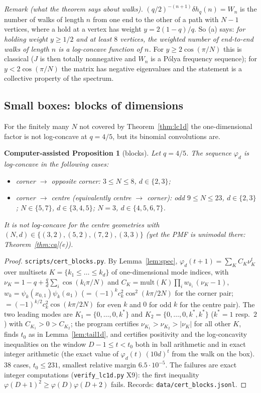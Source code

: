 \documentclass[11pt,a4paper]{article}
\newtheorem{caproposition}[theorem]{Computer-assisted Proposition}
\theoremstyle{definition}
\begin{document}
\emph{Remark (what the theorem says about walks).} $(q/2)^{-(n+1)}\delta h_q(n)=W_n$ is the number of walks of length $n$ from one end to the other of a path with $N-1$ vertices, where a hold at a vertex has weight $y=2(1-q)/q$. So (a) says: \emph{for holding weight $y\ge1/2$ and at least $8$ vertices, the weighted number of end-to-end walks of length $n$ is a log-concave function of $n$.} For $y\ge2\cos(\pi/N)$ this is classical ($J$ is then totally nonnegative and $W_n$ is a P\'olya frequency sequence); for $y<2\cos(\pi/N)$ the matrix has negative eigenvalues and the statement is a collective property of the spectrum.

\subsection{Small boxes: blocks of dimensions}\label{sec:small}

For the finitely many $N$ not covered by Theorem~\ref{thm:lc1d} the one-dimensional factor is not log-concave at $q=4/5$, but its binomial convolutions are.

\begin{caproposition}[blocks]\label{prop:smallblocks}
Let $q=4/5$. The sequence $\varphi_d$ is log-concave in the following cases:
\begin{itemize}
\item corner $\to$ opposite corner: $3\le N\le8$, $d\in\{2,3\}$;
\item corner $\to$ centre (equivalently centre $\to$ corner): odd $9\le N\le23$, $d\in\{2,3\}$; $N\in\{5,7\}$, $d\in\{3,4,5\}$; $N=3$, $d\in\{4,5,6,7\}$.
\end{itemize}
It is \emph{not} log-concave for the centre geometries with $(N,d)\in\{(3,2),(5,2),(7,2),(3,3)\}$ (yet the PMF is unimodal there: Theorem~\ref{thm:ca}(e)).
\end{caproposition}
\begin{proof}
\texttt{scripts/cert\_blocks.py}. By Lemma~\ref{lem:spec}, $\varphi_d(t+1)=\sum_KC_K\nu_K^t$ over multisets $K=\{k_1\le\dots\le k_d\}$ of one-dimensional mode indices, with $\nu_K=1-q+\frac qd\sum_i\cos(k_i\pi/N)$ and $C_K=\mathrm{mult}(K)\prod_iw_{k_i}\,(\nu_K-1)$, $w_k=\psi_k(x_{0,1})\psi_k(a_1)$ ($=(-1)^kc_k^2\cos^2(k\pi/2N)$ for the corner pair; $=(-1)^{k/2}c_k^2\cos(k\pi/2N)$ for even $k$ and $0$ for odd $k$ for the centre pair). The two leading modes are $K_1=\{0,\dots,0,k^*\}$ and $K_2=\{0,\dots,0,k^*,k^*\}$ ($k^*=1$ resp.\ $2$) with $C_{K_1}>0>C_{K_2}$; the program certifies $\nu_{K_1}>\nu_{K_2}>|\nu_K|$ for all other $K$, finds $t_0$ as in Lemma~\ref{lem:tail1d}, and certifies positivity and the log-concavity inequalities on the window $D-1\le t<t_0$ both in ball arithmetic and in exact integer arithmetic (the exact value of $\varphi_d(t)\,(10d)^t$ from the walk on the box). 38 cases, $t_0\le231$, smallest relative margin $6.5\cdot10^{-5}$. The failures are exact integer computations (\texttt{verify\_lc1d.py} X9): the first inequality $\varphi(D+1)^2\ge\varphi(D)\varphi(D+2)$ fails. Records: \texttt{data/cert\_blocks.jsonl}.
\end{proof}
\end{document}
